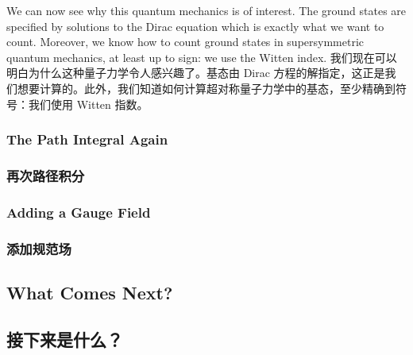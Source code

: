 \documentclass{article}
\begin{document}
\begin{paracol}{2}
We can now see why this quantum mechanics is of interest. The ground states are specified by solutions to the Dirac equation which is exactly what we want to count. Moreover, we know how to count ground states in supersymmetric quantum mechanics, at least up to sign: we use the Witten index.
\switchcolumn
我们现在可以明白为什么这种量子力学令人感兴趣了。基态由 Dirac 方程的解指定，这正是我们想要计算的。此外，我们知道如何计算超对称量子力学中的基态，至少精确到符号：我们使用 Witten 指数。
\switchcolumn*

\subsubsection{The Path Integral Again}
\switchcolumn
\subsubsection*{再次路径积分}
\switchcolumn*

\subsubsection{Adding a Gauge Field}
\switchcolumn
\subsubsection*{添加规范场}
\switchcolumn*

\subsection{What Comes Next?}
\switchcolumn
\subsection*{接下来是什么？}
\switchcolumn*
\end{paracol}
\end{document}
